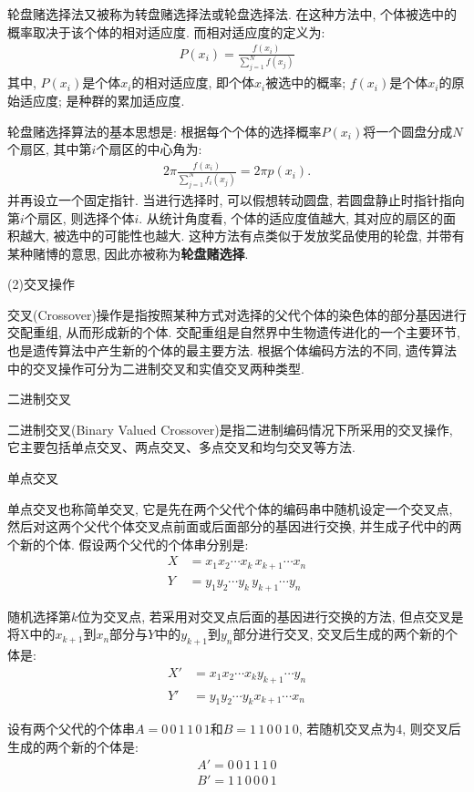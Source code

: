 {\begin{itemize}
    轮盘赌选择法又被称为转盘赌选择法或轮盘选择法. 在这种方法中, 个体被选中的概率取决于该个体的相对适应度. 而相对适应度的定义为:
\begin{align}
  P\left(x_{i}\right)=\frac{f\left(x_{i}\right)}{\sum_{j=1}^{N} f\left(x_{j}\right)}
\end{align}
其中, $P(x_i)$是个体$x_i$的相对适应度, 即个体$x_i$被选中的概率; $f(x_i)$是个体$x_i$的原始适应度; 是种群的累加适应度.
\end{itemize}
    轮盘赌选择算法的基本思想是: 根据每个个体的选择概率$P(x_i)$将一个圆盘分成$N$个扇区, 其中第$i$个扇区的中心角为:
\begin{align}
  2 \pi \frac{f\left(x_{i}\right)}{\sum_{j=1}^{N} f_{i}\left(x_{j}\right)}=2 \pi p\left(x_{i}\right).
\end{align}
并再设立一个固定指针. 当进行选择时, 可以假想转动圆盘, 若圆盘静止时指针指向第$i$个扇区, 则选择个体$i$.
从统计角度看, 个体的适应度值越大, 其对应的扇区的面积越大, 被选中的可能性也越大. 这种方法有点类似于发放奖品使用的轮盘, 并带有某种赌博的意思, 因此亦被称为\textbf{轮盘赌选择}.

(2)交叉操作

交叉(Crossover)操作是指按照某种方式对选择的父代个体的染色体的部分基因进行交配重组, 从而形成新的个体. 交配重组是自然界中生物遗传进化的一个主要环节, 也是遗传算法中产生新的个体的最主要方法. 根据个体编码方法的不同, 遗传算法中的交叉操作可分为二进制交叉和实值交叉两种类型.

     二进制交叉

    二进制交叉(Binary Valued Crossover)是指二进制编码情况下所采用的交叉操作, 它主要包括单点交叉、两点交叉、多点交叉和均匀交叉等方法.

     单点交叉

    单点交叉也称简单交叉, 它是先在两个父代个体的编码串中随机设定一个交叉点, 然后对这两个父代个体交叉点前面或后面部分的基因进行交换, 并生成子代中的两个新的个体. 假设两个父代的个体串分别是:
\begin{align}
    X&=x_1 x_2 \cdots x_k\, x_{k+1} \cdots x_n\\
    Y&=y_1 y_2 \cdots y_k\,  y_{k+1} \cdots y_n
\end{align}

    随机选择第$k$位为交叉点, 若采用对交叉点后面的基因进行交换的方法, 但点交叉是将X中的$x_{k+1}$到$x_n$部分与$Y$中的$y_{k+1}$到$y_n$部分进行交叉, 交叉后生成的两个新的个体是:
\begin{align}
    X'&= x_1 x_2 \cdots x_k y_{k+1} \cdots y_n\\
    Y'&= y_1 y_2 \cdots y_k x_{k+1} \cdots x_n
\end{align}
\begin{example}
设有两个父代的个体串$A=0\, 0\,  1\,  1\,  0\,  1$和$B=1\,  1\,  0\,  0\,  1\,  0$, 若随机交叉点为4, 则交叉后生成的两个新的个体是:
\begin{align}
    A'= 0\, 0\, 1\, 1\, 1\, 0\\
    B'= 1\, 1\, 0\, 0\, 0\, 1
\end{align}
\end{example}

}
